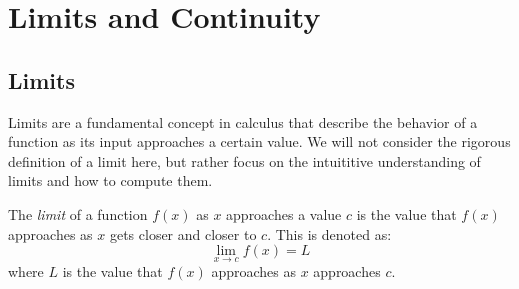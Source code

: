 \chapter{Limits and Continuity}

\section{Limits}\label{sec:limits}

Limits are a fundamental concept in calculus that describe the behavior of a function as its input 
approaches a certain value. We will not consider the rigorous definition of a limit here, but 
rather focus on the intuititive understanding of limits and how to compute them.

\begin{definition}
    The \textit{limit} of a function $f(x)$ as $x$ approaches a value $c$ is the value that $f(x)$ approaches
    as $x$ gets closer and closer to $c$. This is denoted as:
    \begin{equation*}
        \lim_{x \to c} f(x) = L
    \end{equation*}
    where $L$ is the value that $f(x)$ approaches as $x$ approaches $c$.
\end{definition}

